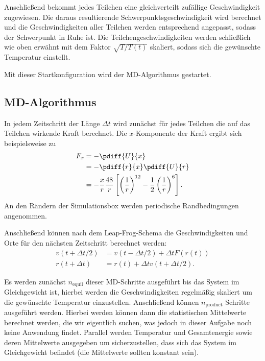 \documentclass[11pt,a4paper]{article}
\newcommand{\ind}[1]{_{\mathrm{#1}}}
\begin{document}
Anschließend bekommt jedes Teilchen eine gleichverteilt zufällige Geschwindigkeit zugewiesen. Die daraus resultierende Schwerpunktsgeschwindigkeit wird berechnet und die Geschwindigkeiten aller Teilchen werden entsprechend angepasst, sodass der Schwerpunkt in Ruhe ist. Die Teilchengeschwindigkeiten werden schließlich wie oben erwähnt mit dem Faktor $\sqrt{ T/T(t)}$ skaliert, sodass sich die gewünschte Temperatur einstellt.

Mit dieser Startkonfiguration wird der MD-Algorithmus gestartet.

\subsection{MD-Algorithmus} %
\label{sub:md_algorithms}
In jedem Zeitschritt der Länge $\Delta t$ wird zunächst für jedes Teilchen die auf das Teilchen wirkende Kraft berechnet. Die $x$-Komponente der Kraft ergibt sich beispielsweise zu
\begin{align}
	F_x &= - \pdiff{U}{x} \\
		&= - \pdiff{r}{x} \pdiff{U}{r} \\
		&= - \frac{x}{r} \frac{48}{r} \left[ \left( \frac{1}{r}  \right)^{12} - \frac{1}{2} \left( \frac{1}{r}  \right)^6     \right]  .
\end{align}
An den Rändern der Simulationsbox werden periodische Randbedingungen angenommen.

Anschließend können nach dem Leap-Frog-Schema die Geschwindigkeiten und Orte für den nächsten Zeitschritt berechnet werden:
\begin{align}
	v(t+\Delta t/2) &= v(t-\Delta t/2) + \Delta t F(r(t))\\
	r(t+\Delta t) &= r(t) + \Delta t v(t+\Delta t/2).
\end{align}

Es werden zunächst $n\ind{equil}$ dieser MD-Schritte ausgeführt bis das System im Gleichgewicht ist, hierbei werden die Geschwindigkeiten regelmäßig skaliert um die gewünschte Temperatur einzustellen. Anschließend können $n\ind{product}$ Schritte ausgeführt werden. Hierbei werden können dann die statistischen Mittelwerte berechnet werden, die wir eigentlich suchen, was jedoch in dieser Aufgabe noch keine Anwendung findet. Parallel werden Temperatur und Gesamtenergie sowie deren Mittelwerte ausgegeben um sicherzustellen, dass sich das System im Gleichgewicht befindet (die Mittelwerte sollten konstant sein).
\end{document}
